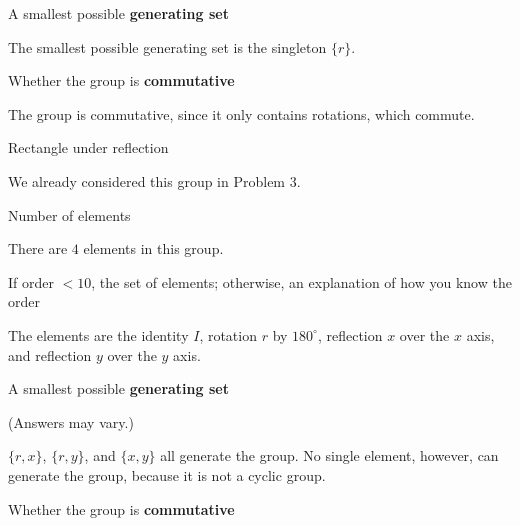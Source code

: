 \documentclass[../key.tex]{subfiles}
\begin{document}
\begin{inner_problem}
\item A smallest possible \textbf{generating set}
\end{inner_problem}

\noindent The smallest possible generating set is the singleton $\{r\}$.

\begin{inner_problem}
\item Whether the group is \textbf{commutative}
\end{inner_problem}

\noindent The group is commutative, since it only contains rotations, which commute.

\begin{outer_problem}
\item Rectangle under reflection
\end{outer_problem}

\noindent We already considered this group in Problem 3.

\begin{inner_problem}[start=1]
\item Number of elements
\end{inner_problem}

\noindent There are $4$ elements in this group.

\begin{inner_problem}
\item If order $< 10$, the set of elements; otherwise, an explanation of how you know the order
\end{inner_problem}

\noindent The elements are the identity $I$, rotation $r$ by $180^\circ$, reflection $x$ over the $x$ axis, and reflection $y$ over the $y$ axis.

\begin{inner_problem}
\item A smallest possible \textbf{generating set}
\end{inner_problem}

\noindent (Answers may vary.)

$\{r,x\}$, $\{r,y\}$, and $\{x,y\}$ all generate the group. No single element, however, can generate the group, because it is not a cyclic group.

\begin{inner_problem}
\item Whether the group is \textbf{commutative}
\end{inner_problem}
\end{document}

